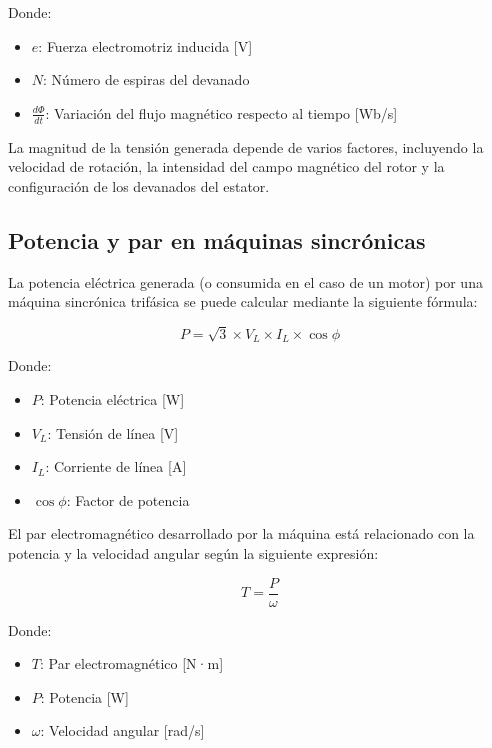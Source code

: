 \documentclass[../main]{subfiles}
\begin{document}
Donde:
\begin{itemize}
    \item $e$: Fuerza electromotriz inducida [V]
    \item $N$: Número de espiras del devanado
    \item $\frac{d\Phi}{dt}$: Variación del flujo magnético respecto al tiempo [Wb/s]
\end{itemize}

La magnitud de la tensión generada depende de varios factores, incluyendo la velocidad de rotación, la intensidad del campo magnético del rotor y la configuración de los devanados del estator.

\subsection{Potencia y par en máquinas sincrónicas}

La potencia eléctrica generada (o consumida en el caso de un motor) por una máquina sincrónica trifásica se puede calcular mediante la siguiente fórmula:

\begin{equation}
P = \sqrt{3} \times V_L \times I_L \times \cos\phi
\end{equation}

Donde:
\begin{itemize}
    \item $P$: Potencia eléctrica [W]
    \item $V_L$: Tensión de línea [V]
    \item $I_L$: Corriente de línea [A]
    \item $\cos\phi$: Factor de potencia
\end{itemize}

El par electromagnético desarrollado por la máquina está relacionado con la potencia y la velocidad angular según la siguiente expresión:

\begin{equation}
T = \frac{P}{\omega}
\end{equation}

Donde:
\begin{itemize}
    \item $T$: Par electromagnético [N·m]
    \item $P$: Potencia [W]
    \item $\omega$: Velocidad angular [rad/s]
\end{itemize}
\end{document}
